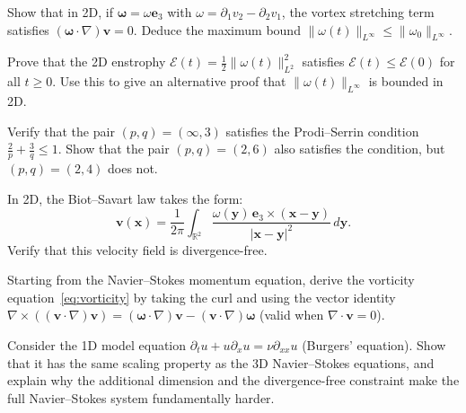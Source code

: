 \begin{exercise}
\label{ex:NS-2D-vorticity}
Show that in 2D, if $\boldsymbol{\omega} = \omega \mathbf{e}_3$ with $\omega = \partial_1 v_2 - \partial_2 v_1$, the vortex stretching term satisfies $(\boldsymbol{\omega} \cdot \nabla)\mathbf{v} = 0$. Deduce the maximum bound $\|\omega(t)\|_{L^\infty} \le \|\omega_0\|_{L^\infty}$.
\end{exercise}

\begin{exercise}
\label{ex:NS-2D-enstrophy}
Prove that the 2D enstrophy $\mathcal{E}(t) = \frac{1}{2}\|\omega(t)\|_{L^2}^2$ satisfies $\mathcal{E}(t) \le \mathcal{E}(0)$ for all $t \ge 0$. Use this to give an alternative proof that $\|\omega(t)\|_{L^\infty}$ is bounded in 2D.
\end{exercise}

\begin{exercise}
\label{ex:NS-prodi-serrin}
Verify that the pair $(p, q) = (\infty, 3)$ satisfies the Prodi--Serrin condition $\frac{2}{p} + \frac{3}{q} \le 1$. Show that the pair $(p, q) = (2, 6)$ also satisfies the condition, but $(p, q) = (2, 4)$ does not.
\end{exercise}

\begin{exercise}
\label{ex:NS-biot-savart}
In 2D, the Biot--Savart law takes the form:
\[
\mathbf{v}(\mathbf{x}) = \frac{1}{2\pi} \int_{\mathbb{R}^2} \frac{\omega(\mathbf{y}) \, \mathbf{e}_3 \times (\mathbf{x} - \mathbf{y})}{|\mathbf{x} - \mathbf{y}|^2} \, d\mathbf{y}.
\]
Verify that this velocity field is divergence-free.
\end{exercise}

\begin{exercise}
\label{ex:NS-vorticity-eq}
Starting from the Navier--Stokes momentum equation, derive the vorticity equation~\eqref{eq:vorticity} by taking the curl and using the vector identity $\nabla \times ((\mathbf{v} \cdot \nabla)\mathbf{v}) = (\boldsymbol{\omega} \cdot \nabla)\mathbf{v} - (\mathbf{v} \cdot \nabla)\boldsymbol{\omega}$ (valid when $\nabla \cdot \mathbf{v} = 0$).
\end{exercise}

\begin{exercise}
\label{ex:NS-1D-model}
Consider the 1D model equation $\partial_t u + u \partial_x u = \nu \partial_{xx} u$ (Burgers' equation). Show that it has the same scaling property as the 3D Navier--Stokes equations, and explain why the additional dimension and the divergence-free constraint make the full Navier--Stokes system fundamentally harder.
\end{exercise}

